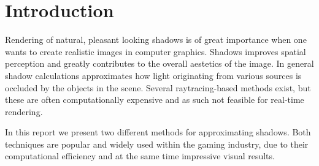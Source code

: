 \section{Introduction}

Rendering of natural, pleasant looking shadows is of great importance
when one wants to create realistic images in computer
graphics. Shadows improves spatial perception and greatly contributes
to the overall aestetics of the image. In general shadow calculations
approximates how light originating from various sources is occluded by
the objects in the scene. Several raytracing-based methods exist,
but these are often computationally expensive and as such not feasible
for real-time rendering. 

In this report we present two different methods for approximating
shadows. Both techniques are popular and widely used within the gaming
industry, due to their computational efficiency and at the same time
impressive visual results.